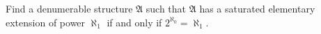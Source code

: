 Find a denumerable structure $\mathfrak{A}$ such that $\mathfrak{A}$ has a saturated elementary extension of power $\aleph_1$ if and only if $2^{\aleph_0} = \aleph_1$.
